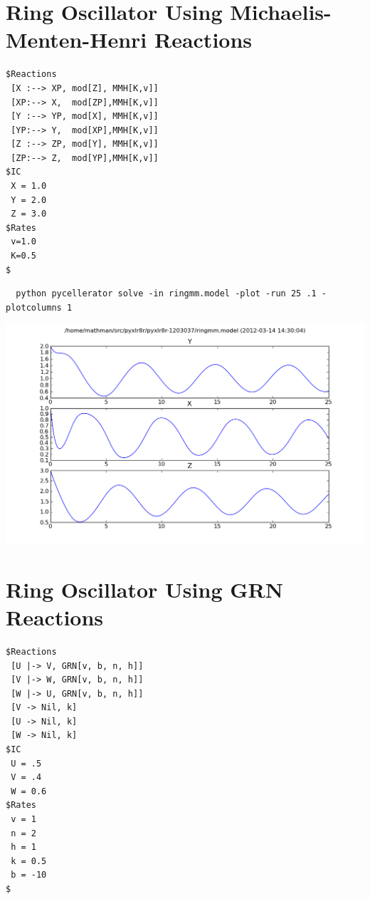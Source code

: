  \clearpage


\section[Ring Oscillator (MMH)]{Ring Oscillator Using Michaelis-Menten-Henri Reactions}


\begin{lstlisting}
$Reactions
 [X :--> XP, mod[Z], MMH[K,v]]
 [XP:--> X,  mod[ZP],MMH[K,v]]
 [Y :--> YP, mod[X], MMH[K,v]]
 [YP:--> Y,  mod[XP],MMH[K,v]]
 [Z :--> ZP, mod[Y], MMH[K,v]]
 [ZP:--> Z,  mod[YP],MMH[K,v]]
$IC
 X = 1.0
 Y = 2.0
 Z = 3.0
$Rates
 v=1.0
 K=0.5
$
\end{lstlisting}

\begin{lstlisting}
  python pycellerator solve -in ringmm.model -plot -run 25 .1 -plotcolumns 1
\end{lstlisting}

\begin{center}
\includegraphics[width=\textwidth]{ringmm.png}
\end{center}

 \clearpage
 
\section{Ring Oscillator Using GRN Reactions}

\begin{lstlisting}
$Reactions
 [U |-> V, GRN[v, b, n, h]]
 [V |-> W, GRN[v, b, n, h]]
 [W |-> U, GRN[v, b, n, h]]
 [V -> Nil, k]
 [U -> Nil, k]
 [W -> Nil, k]
$IC
 U = .5
 V = .4
 W = 0.6
$Rates
 v = 1
 n = 2
 h = 1
 k = 0.5
 b = -10
$
\end{lstlisting}

